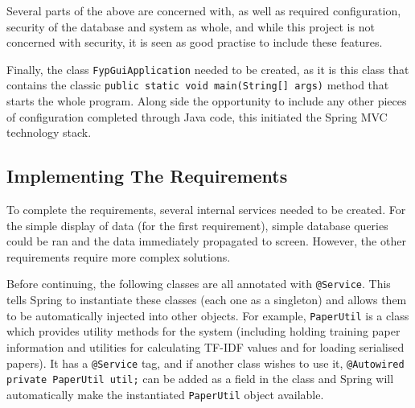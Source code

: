 Several parts of the above are concerned with, as well as required configuration, security of the database and system as whole, and while this project is not concerned with security, it is seen as good practise to include these features.

Finally, the class \texttt{FypGuiApplication} needed to be created, as it is this class that contains the classic \texttt{public static void main(String[] args)} method that starts the whole program. Along side the opportunity to include any other pieces of configuration completed through Java code, this initiated the Spring MVC technology stack.

\subsection*{Implementing The Requirements}
To complete the requirements, several internal services needed to be created. For the simple display of data (for the first requirement), simple database queries could be ran and the data immediately propagated to screen. However, the other requirements require more complex solutions. 

Before continuing, the following classes are all annotated with \texttt{@Service}. This tells Spring to instantiate these classes (each one as a singleton) and allows them to be automatically injected into other objects. For example, \texttt{PaperUtil} is a class which provides utility methods for the system (including holding training paper information and utilities for calculating TF-IDF values and for loading serialised papers). It has a \texttt{@Service} tag, and if another class wishes to use it, \texttt{@Autowired private PaperUtil util;} can be added as a field in the class and Spring will automatically make the instantiated \texttt{PaperUtil} object available.

